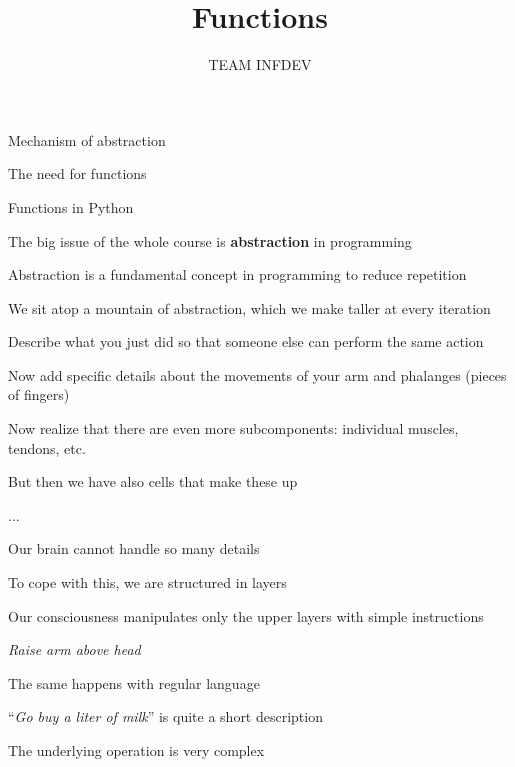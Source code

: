\documentclass{beamer}
\title{Functions}
\author{TEAM INFDEV}
\institute{Hogeschool Rotterdam \\ 
Rotterdam, Netherlands}
\date{}
\begin{document}
\maketitle

\begin{slide}{
\item Mechanism of abstraction
\item The need for functions
\item Functions in Python
}\end{slide}

\begin{slide}{
\item The big issue of the whole course is \textbf{abstraction} in programming
\item Abstraction is a fundamental concept in programming to reduce repetition
\item We sit atop a mountain of abstraction, which we make taller at every iteration
}\end{slide}

\begin{slide}{
\item Describe what you just did so that someone else can perform the same action
\pause
\item Now add specific details about the movements of your arm and phalanges (pieces of fingers)
\pause
\item Now realize that there are even more subcomponents: individual muscles, tendons, etc.
\pause
\item But then we have also cells that make these up
\item ...
}\end{slide}

\begin{slide}{
\item Our brain cannot handle so many details
\item To cope with this, we are structured in layers
\item Our consciousness manipulates only the upper layers with simple instructions
\item \textit{Raise arm above head}
}\end{slide}

\begin{slide}{
\item The same happens with regular language
\item ``\textit{Go buy a liter of milk}'' is quite a short description
\item The underlying operation is very complex
}\end{slide}
\end{document}
